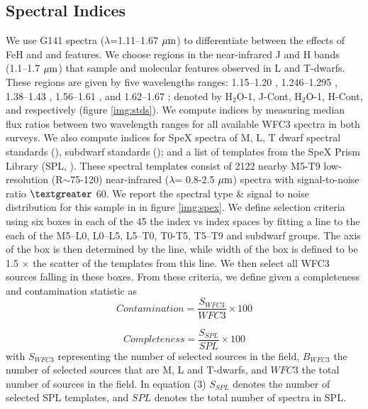 \documentclass[manuscript]{aastex}
\begin{document}
\subsection{Spectral Indices}
We use G141 spectra  ($\lambda$=1.11--1.67 $\mbox{$\mu$m}$) to differentiate between the effects of FeH and \wat and \meth features. We choose regions in the near-infrared J and H bands (1.1--1.7 $\mbox{$\mu$m}$) that sample \meth and \wat  molecular features observed in L and T-dwarfs. These regions are given by five wavelengths ranges: 1.15--1.20 \micron, 1.246--1.295 \micron, 1.38--1.43 \micron,  1.56--1.61 \micron, and 1.62--1.67 \micron; denoted by H$_2$O-1, J-Cont, H$_2$O-1, H-Cont, and \meth respectively (figure \ref{img:stds}). We compute indices by measuring median flux ratios between two wavelength ranges for all available WFC3 spectra in both surveys. 
We also compute indices for SpeX spectra of M, L, T dwarf spectral standards (\citealt{2005ARA&A..43..195K}), subdwarf standards (\citealt{2007ApJ...669.1235L}); and a list of templates from the SpeX Prism Library (SPL, \citealt{2014arXiv1406.4887B}). These spectral templates consist of 2122 nearby M5-T9 low-resolution (R$\sim$75-120) near-infrared ($\lambda$= 0.8-2.5 $\mbox{$\mu$m}$) spectra with signal-to-noise ratio $\textgreater$ 60. We report the spectral type \& signal to noise distribution for this sample in in figure \ref{img:spex}.
We define selection criteria using six  boxes in each of the 45 the index vs index spaces by fitting a line to the each of the  M5--L0, L0--L5, L5--T0, T0-T5, T5--T9 and subdwarf groups. The axis of the box is then determined  by the line, while width of the box is defined to be 1.5 $\times$ the scatter  of the templates from this line. We then select all WFC3 sources falling in these boxes. From these criteria, we define given a completeness and  contamination statistic as
\begin{equation}
    Contamination= \frac{S_{WFC3}}{WFC3}\times 100
\end{equation}

\begin{equation}
    Completeness= \frac{S_{SPL}}{SPL}\times 100
\end{equation} with $S_{WFC3}$ representing the number of selected sources in the field, $B_{WFC3}$ the number of selected sources that are M, L and T-dwarfs, and $WFC3$ the total number of sources in the field. In equation (3) $S_{SPL}$ denotes the number of selected SPL templates, and $SPL$ denotes the total number of spectra in SPL. 
\end{document}

